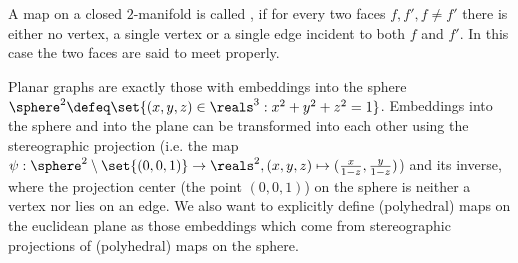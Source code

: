 \begin{definition} \label{def:polymap} A map on a closed $2$-manifold is called , if for every two faces $f, f', f \neq f'$ there is either no vertex, a single vertex or a single edge incident to both $f$ and $f'$. In this case the two faces are said to meet properly.
\end{definition}

\begin{remark} Planar graphs are exactly those with embeddings into the sphere $\sphere^2 \defeq \set{(x, y, z) \in \reals^3 : x^2 + y^2 + z^2 = 1}$. Embeddings into the sphere and into the plane can be transformed into each other using the stereographic projection (i.e. the map $\psi: \sphere^2 \setminus \set{(0, 0, 1)} \to \reals^2, (x, y, z) \mapsto (\frac{x}{1-z}, \frac{y}{1-z})$) and its inverse, where the projection center (the point $(0, 0, 1)$) on the sphere is neither a vertex nor lies on an edge. We also want to explicitly define (polyhedral) maps on the euclidean plane as those embeddings which come from stereographic projections of (polyhedral) maps on the sphere.
\end{remark}

